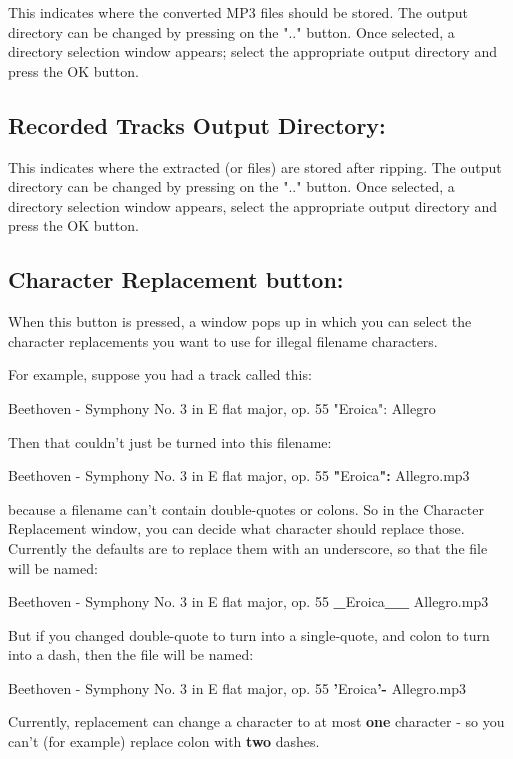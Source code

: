 This indicates where the converted MP3 files should be stored. The output
directory can be changed by pressing on the ".." button. Once selected, a
directory selection window appears; select the appropriate output directory and
press the OK button.


\subsection{Recorded Tracks Output Directory:}

This indicates where the extracted  (or
 files) are stored after ripping.
The output directory can be changed by pressing on the ".." button. Once
selected, a directory selection window appears, select the appropriate output
directory and press the OK button.

\subsection{Character Replacement button:}

When this button is pressed, a window pops up in which you can select the character
replacements you want to use for illegal filename characters.

For example, suppose you had a track called this:

Beethoven - Symphony No. 3 in E flat major, op. 55 "Eroica": Allegro

Then that couldn't just be turned into this filename:

Beethoven - Symphony No. 3 in E flat major, op. 55 {\bf "}Eroica{\bf ":} Allegro.mp3

because a filename can't contain double-quotes or colons.  So in the
Character Replacement window, you can decide what character should replace
those.  Currently the defaults are to replace them with an underscore,
so that the file will be named:

Beethoven - Symphony No. 3 in E flat major, op. 55 {\bf _}Eroica{\bf __} Allegro.mp3

But if you changed double-quote to turn into a single-quote, and colon
to turn into a dash, then the file will be named:

Beethoven - Symphony No. 3 in E flat major, op. 55 {\bf '}Eroica{\bf '-} Allegro.mp3

Currently, replacement can change a character to at most {\bf one} character - so
you can't (for example) replace colon with {\bf two} dashes.


